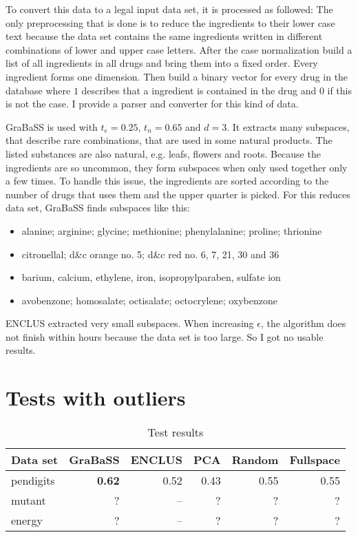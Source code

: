To convert this data to a legal input data set, it is processed as followed: The only preprocessing that is done is to reduce the ingredients to their lower case text because the data set contains the same ingredients written in different combinations of lower and upper case letters. After the case normalization build a list of all ingredients in all drugs and bring them into a fixed order. Every ingredient forms one dimension. Then build a binary vector for every drug in the database where $1$ describes that a ingredient is contained in the drug and $0$ if this is not the case. I provide a parser and converter for this kind of data.

GraBaSS is used with $t_e = 0.25$, $t_n = 0.65$ and $d = 3$. It extracts many subspaces, that describe rare combinations, that are used in some natural products. The listed substances are also natural, e.g. leafs, flowers and roots. Because the ingredients are so uncommon, they form subspaces when only used together only a few times. To handle this issue, the ingredients are sorted according to the number of drugs that uses them and the upper quarter is picked. For this reduces data set, GraBaSS finds subspaces like this: 
\begin{itemize}
	\item alanine; arginine; glycine; methionine; phenylalanine; proline; thrionine
	\item citronellal; d\&c orange no. 5; d\&c red no. 6, 7, 21, 30 and 36
	\item barium, calcium, ethylene, iron, isopropylparaben, sulfate ion
	\item avobenzone; homosalate; octisalate; octocrylene; oxybenzone
\end{itemize}

ENCLUS extracted very small subspaces. When increasing $\epsilon$, the algorithm does not finish within hours because the data set is too large. So I got no usable results.

\section{Tests with outliers}

\begin{table}
	\caption{Test results}
	\label{tab:tests}
	\centering
	\begin{tabular}{lrrrrr}
		\toprule
		\textbf{Data set} & \textbf{GraBaSS} & \textbf{ENCLUS} & \textbf{PCA} & \textbf{Random} & \textbf{Fullspace} \\
		\midrule
		pendigits & \textbf{\num{0.62}} & \num{0.52} & \num{0.43} & \num{0.55} & \num{0.55} \\
		mutant & ? & -- & ? & ? & ? \\
		energy & ? & -- & ? & ? & ? \\
		\bottomrule
	\end{tabular}
\end{table}

